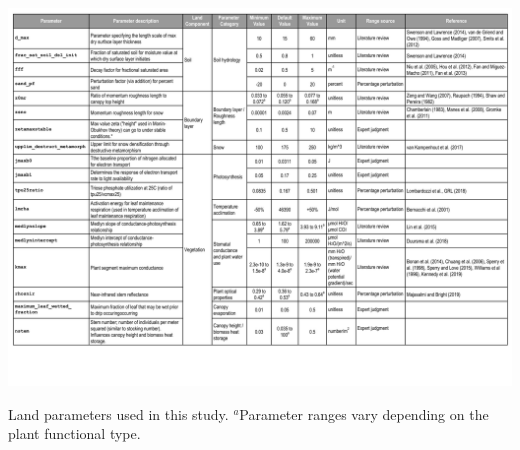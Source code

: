 \documentclass[draft, grl]{agujournal2019}
\begin{document}
\begin{table}
\noindent\includegraphics[width=\textwidth]{writing/figs/Table_Parameter_List.pdf}
  \caption{Land parameters used in this study. 
  $^a$Parameter ranges vary depending on the plant functional type.}
 \label{table:param_list}
 \end{table}




%
\end{document}
